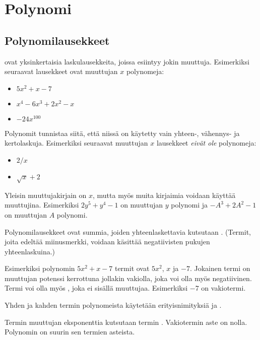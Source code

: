 \chapter{Polynomi}

\section{Polynomilausekkeet}

 ovat yksinkertaisia laskulausekkeita, joissa esiintyy jokin muuttuja.
Esimerkiksi seuraavat lausekkeet ovat muuttujan $x$ polynomeja:
\begin{itemize}
\item $5x^2+x-7$
\item $x^4-6x^3+2x^2-x$
\item $-24x^{100}$
\end{itemize}
Polynomit tunnistaa siitä, että niissä on käytetty vain yhteen-, vähennys- ja kertolaskuja.
Esimerkiksi seuraavat muuttujan $x$ lausekkeet \emph{eivät ole} polynomeja:
\begin{itemize}
\item $2/x$
\item $\sqrt{x}+2$
\end{itemize}
Yleisin muuttujakirjain on $x$, mutta myös muita kirjaimia voidaan käyttää
muuttujina. Esimerkiksi $2y^5+y^4-1$ on muuttujan $y$ polynomi ja
$-A^3+2A^2-1$ on muuttujan $A$ polynomi.

Polynomilausekkeet ovat summia, joiden yhteenlaskettavia kutsutaan . (Termit, joita edeltää miinusmerkki, voidaan käsittää negatiivisten pukujen yhteenlaskuina.)

Esimerkiksi polynomin $5x^2+x-7$ termit ovat $5x^2$, $x$ ja $-7$. Jokainen termi on muuttujan potenssi kerrottuna jollakin vakiolla, joka voi olla myös  negatiivinen. Termi voi olla myös , joka ei sisällä muuttujaa. Esimerkiksi $-7$ on vakiotermi.

Yhden ja kahden termin polynomeista käytetään erityisnimityksiä  ja .

Termin muuttujan eksponenttia kutsutaan termin .
Vakiotermin aste on nolla.
Polynomin  on suurin sen termien asteista.

